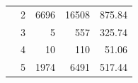 \begin{table}[htbp]
\begin{tabular}{rrrrr}
                                                                                           & \multicolumn{1}{r|}{2} & 6696   & 16508  & 875.84   \\
                                                                                           & \multicolumn{1}{r|}{3} & 5      & 557    & 325.74   \\
                                                                                           & \multicolumn{1}{r|}{4} & 10     & 110    & 51.06    \\
                                                                                           & \multicolumn{1}{r|}{5} & 1974   & 6491   & 517.44   \\ \hline
\end{tabular}
\end{table}





